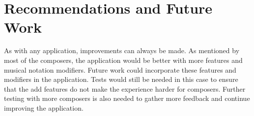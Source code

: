 \begin{comment}
		The application's usability was also compared with that of current tools in the market (see Table \ref{tab:app-usability-scores}). Both Komp and Notion were commercially available musical notation tools, with Notion being the top-rated application for musical notation. With that said, it is surprising to see that the difference between the usability scores of Flow and Notion are not that far. Flow sits at 3.0 while Notion is at 3.6, giving them only a difference of 0.6. In truth, comments between them were mixed. Around nine (9) composers said they liked Flow the most while around fourteen (14) said they preferred Notion, with two (2) composers liking Komp. From the qualitative interviews it was found that 20 out of the 25 total composers in iteration 3 and 4 combined liked Flow's interaction more than Notion. They preferred its simplicity and straightforwardness. Some comments were that the cursor and the notation menu made adding and selecting immediately understandable with just one glance. However, Notion beats Flow in terms of completeness of features, giving it a slightly higher score than Flow. 

		In summary, this study designed and developed an application that allows composers to perform compositional tasks like adding, editing, and deleting notes or rest. The interactions for these functions were designed and improved with the help of the users tests. Advanced tasks like cut/copy/paste or highlighting were also made possible through the use of gestures like dragging or swiping. The design and user experience of the application was tested repeatedly with composers of different skill levels through different setups and use cases over the course of four (4) iterations. 
		\end{comment}
		
	\section{Recommendations and Future Work}

		As with any application, improvements can always be made. As mentioned by most of the composers, the application would be better with more features and musical notation modifiers. Future work could incorporate these features and modifiers in the application. Tests would still be needed in this case to ensure that the add features do not make the experience harder for composers. Further testing with more composers is also needed to gather more feedback and continue improving the application. 

